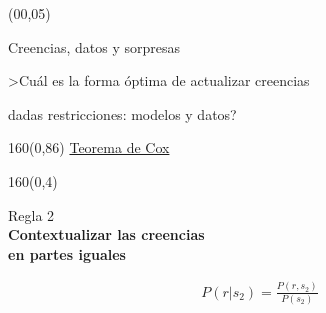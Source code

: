 \documentclass[shownotes,aspectratio=169]{beamer}
\newif\ifen
\newif\ifes
\newcommand{\en}[1]{\ifen#1\fi}
\newcommand{\es}[1]{\ifes#1\fi}
\begin{document}
\color{black!85}
\large

\begin{frame}
 
 \begin{textblock}{90}(00,05)
\begin{center}
 \huge  \textcolor{black!66}{Creencias, datos y sorpresas}
\end{center}
\end{textblock}

{}
\end{frame}


\begin{frame}[plain]

\vspace{0.75cm}

 \begin{center}
  \Large >Cuál es la forma \'optima de actualizar creencias 
  
dadas restricciones: modelos y datos?
 \end{center}

\begin{textblock}{160}(0,86)
\tiny \centering
\href{https://doi.org/10.1016/S0888-613X(03)00051-3}{Teorema de Cox}
\end{textblock}

\end{frame}
 
 

\begin{frame}[plain]
\begin{textblock}{160}(0,4)
 \centering \LARGE 
 \en{Hidden variables and honest reasoning}
 \es{Creencias y razonamiento \textbf{honesto}}
 \end{textblock}
 \vspace{1cm}
 
\begin{center}
  Regla 2 \\
\LARGE
\textbf{Contextualizar las creencias \\ en partes iguales}
 \end{center}

 \begin{align*}
 P(r|s_2) = \frac{P(r, s_2)}{P(s_2)}
 \end{align*} 

 
\end{frame}
\end{document}
